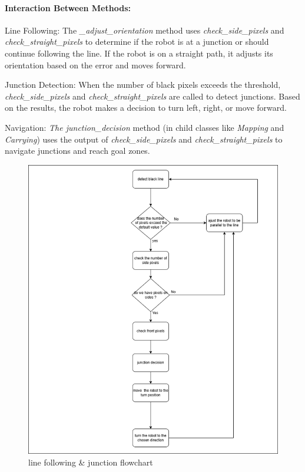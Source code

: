 \documentclass[a4paper,12pt]{extreport}
\begin{document}
\paragraph{Interaction Between Methods:}
Line Following: The \emph{\_adjust\_orientation} method uses
\emph{check\_side\_pixels} and \emph{check\_straight\_pixels} to
determine if the robot is at a junction or should continue following the
line. If the robot is on a straight path, it adjusts its orientation
based on the error and moves forward.

Junction Detection: When the number of black pixels exceeds the
threshold,\\ \emph{check\_side\_pixels} and \emph{check\_straight\_pixels}
are called to detect junctions. Based on the results, the robot makes a
decision to turn left, right, or move forward.

Navigation: \emph{The junction\_decision} method (in child classes like
\emph{Mapping} and \emph{Carrying}) uses the output of
\emph{check\_side\_pixels} and \emph{check\_straight\_pixels} to
navigate junctions and reach goal zones.


\begin{figure}
\centering
\includegraphics[width=\textwidth]{img/image043.png}
\caption{line following \& junction flowchart}
\label{judeFig31}
\end{figure}
\newpage
\end{document}
